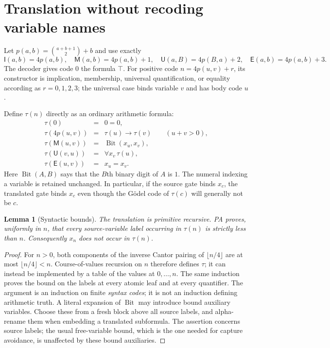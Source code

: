 \documentclass[11pt]{article}
\newtheorem{lemma}[theorem]{Lemma}
\newcommand{\Bit}{\operatorname{Bit}}
\newcommand{\I}{\mathsf I}
\newcommand{\M}{\mathsf M}
\newcommand{\U}{\mathsf U}
\newcommand{\E}{\mathsf E}
\newcommand{\tr}{\tau}
\begin{document}
\section{Translation without recoding variable names}

Let $p(a,b)=\binom{a+b+1}{2}+b$ and use exactly
\[
 \I(a,b)=4p(a,b),\quad \M(a,b)=4p(a,b)+1,\quad
 \U(a,B)=4p(B,a)+2,\quad \E(a,b)=4p(a,b)+3.
\]
The decoder gives code $0$ the formula $\top$.  For positive code
$n=4p(u,v)+r$, its constructor is implication, membership, universal
quantification, or equality according as $r=0,1,2,3$; the universal case
binds variable \emph{$v$} and has body code $u$.

Define $\tr(n)$ directly as an ordinary arithmetic formula:
\[
\begin{array}{rcl}
 \tr(0)&=&0=0,\\
 \tr(4p(u,v))&=&\tr(u)\to\tr(v)\qquad(u+v>0),\\
 \tr(\M(u,v))&=&\Bit(x_u,x_v),\\
 \tr(\U(v,u))&=&\forall x_v\,\tr(u),\\
 \tr(\E(u,v))&=&x_u=x_v.
\end{array}
\]
Here $\Bit(A,B)$ says that the $B$th binary digit of $A$ is $1$.
The numeral indexing a variable is retained unchanged.  In particular,
if the source gate binds $x_c$, the translated gate binds $x_c$ even
though the G\"odel code of $\tr(c)$ will generally not be $c$.

\begin{lemma}[Syntactic bounds]
The translation is primitive recursive.  PA proves, uniformly in $n$,
that every source-variable label occurring in $\tr(n)$ is strictly
less than $n$.  Consequently $x_n$ does not occur in $\tr(n)$.
\end{lemma}
\begin{proof}
For $n>0$, both components of the inverse Cantor pairing of
$\lfloor n/4\rfloor$ are at most $\lfloor n/4\rfloor<n$.
Course-of-values recursion on $n$ therefore defines $\tr$; it can
instead be implemented by a table of the values at $0,\ldots,n$.
The same induction proves the bound on the labels at every atomic
leaf and at every quantifier.  The argument is an induction on finite
\emph{syntax codes}; it is not an induction defining arithmetic truth.
A literal expansion of $\Bit$ may introduce bound auxiliary variables.
Choose these from a fresh block above all source labels, and alpha-rename
them when embedding a translated subformula.  The assertion concerns
source labels; the usual free-variable bound, which is the one needed
for capture avoidance, is unaffected by these bound auxiliaries.
\end{proof}
\end{document}

